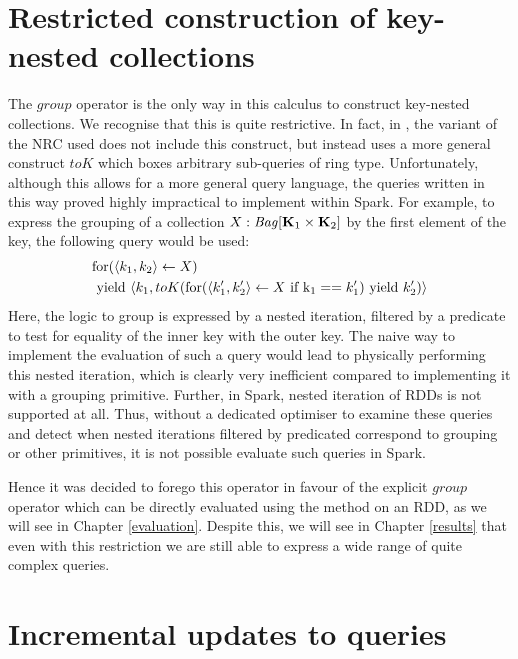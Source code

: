 {{{\section{Restricted construction of key-nested collections}
The $group$ operator is the only way in this calculus to construct key-nested collections. We recognise that this is quite restrictive. In fact, in \cite{draftpaper}, the variant of the NRC used does not include this construct, but instead uses a more general construct $toK$ which boxes arbitrary sub-queries of ring type. Unfortunately, although this allows for a more general query language, the queries written in this way proved highly impractical to implement within Spark. For example, to express the grouping of a collection $X: \textrm{\textit{Bag}}[\mathbf{K}_1 \times \mathbf{K}_2]$ by the first element of the key, the following query would be used:
\begin{equation*}
\begin{split}
&\textrm{for}(\langle k_1, k_2 \rangle \leftarrow X) \\
&\textrm{ yield } \langle k_1, toK(\textrm{for}(\langle k_1', k_2' \rangle \leftarrow X \textrm{ if k}_1 == k_1') \textrm{ yield } k_2') \rangle
\end{split}
\end{equation*}
Here, the logic to group is expressed by a nested iteration, filtered by a predicate to test for equality of the inner key with the outer key.
The naive way to implement the evaluation of such a query would lead to physically performing this nested iteration, which is clearly very inefficient compared to implementing it with a grouping primitive. Further, in Spark, nested iteration of RDDs is not supported at all.
Thus, without a dedicated optimiser to examine these queries and detect when nested iterations filtered by predicated correspond to grouping or other primitives, it is not possible evaluate such queries in Spark.

Hence it was decided to forego this operator in favour of the explicit $group$ operator which can be directly evaluated using the  method on an RDD, as we will see in Chapter \ref{evaluation}.
Despite this, we will see in Chapter \ref{results} that even with this restriction we are still able to express a wide range of quite complex queries. 

}

\section{Incremental updates to queries} { \label{deltas}

}}}

